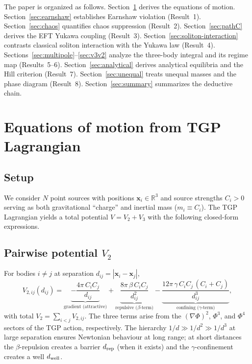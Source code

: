 \documentclass[11pt,a4paper]{article}
\newcommand{\vx}{\mathbf{x}}
\newcommand{\bR}{\mathbb{R}}
\newcommand{\dij}{d_{ij}}
\newcommand{\drep}{d_{\rm rep}}
\newcommand{\dwell}{d_{\rm well}}
\begin{document}
The paper is organized as follows.
Section~\ref{sec:eom} derives the equations of motion.
Section~\ref{sec:earnshaw} establishes Earnshaw violation (Result~1).
Section~\ref{sec:chaos} quantifies chaos suppression (Result~2).
Section~\ref{sec:pathC} derives the EFT Yukawa coupling (Result~3).
Section~\ref{sec:soliton-interaction} contrasts classical soliton
interaction with the Yukawa law (Result~4).
Sections~\ref{sec:multipole}--\ref{sec:v3v2} analyze the three-body
integral and its regime map (Results~5--6).
Section~\ref{sec:analytical} derives analytical equilibria and the
Hill criterion (Result~7).
Section~\ref{sec:unequal} treats unequal masses and the phase diagram
(Result~8).
Section~\ref{sec:summary} summarizes the deductive chain.

\section{Equations of motion from TGP Lagrangian}
\label{sec:eom}

\subsection{Setup}

We consider $N$ point sources with positions $\vx_i \in \bR^3$ and
source strengths $C_i > 0$ serving as both gravitational ``charge'' and
inertial mass ($m_i \equiv C_i$).  The TGP Lagrangian yields a
total potential $V = V_2 + V_3$ with the following closed-form expressions.

\subsection{Pairwise potential $V_2$}

For bodies $i \neq j$ at separation $\dij = |\vx_i - \vx_j|$,
\begin{equation}
  \boxed{
  V_{2,ij}(\dij)
  = \underbrace{-\frac{4\pi\,C_i C_j}{\dij}}_{\text{gradient (attractive)}}
  + \underbrace{\frac{8\pi\,\beta\,C_i C_j}{\dij^2}}_{\text{repulsive ($\beta$-term)}}
  - \underbrace{\frac{12\pi\,\gamma\,C_i C_j\,(C_i + C_j)}{\dij^3}}_{\text{confining ($\gamma$-term)}},
  }
  \label{eq:V2}
\end{equation}
with total $V_2 = \sum_{i<j} V_{2,ij}$.  The three terms arise from the
$(\nabla\Phi)^2$, $\Phi^3$, and $\Phi^4$ sectors of the TGP action,
respectively.  The hierarchy $1/d \gg 1/d^2 \gg 1/d^3$ at large
separation ensures Newtonian behaviour at long range; at short distances
the $\beta$-repulsion creates a barrier $\drep$ (when it exists) and the
$\gamma$-confinement creates a well $\dwell$.
\end{document}
